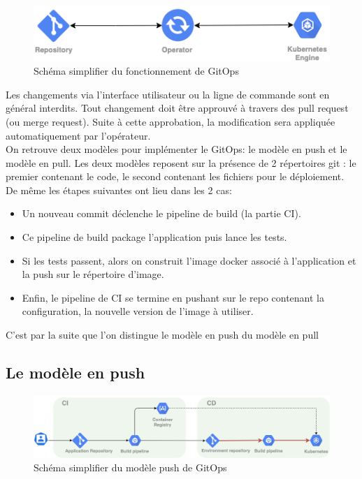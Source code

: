 \documentclass[11pt,fleqn]{book} %
\begin{document}
\begin{figure}[H]\centering
\renewcommand{\figurename}{Graphique}
\includegraphics[scale=0.8]{Pictures/CI-CD/gitops-Intro.png}
\captionsetup{margin=1.5cm,format=hang,justification=justified}
\caption[]{Schéma simplifier du fonctionnement de GitOps \newline}
\end{figure}

Les changements via l’interface utilisateur ou la ligne de commande sont en général interdits. Tout changement doit être approuvé à travers des pull request (ou merge request). Suite à cette approbation, la modification sera appliquée automatiquement par l’opérateur.\\

On retrouve deux modèles pour implémenter le GitOps: le modèle en push et le modèle en pull. Les deux modèles reposent sur la présence de 2 répertoires git : le premier contenant le code, le second contenant les fichiers pour le déploiement. De même les étapes suivantes ont lieu dans les 2 cas: 
\begin{itemize}
     \item Un nouveau commit déclenche le pipeline de build (la partie CI).
    \item Ce pipeline de build package l'application puis lance les tests.
    \item Si les tests passent, alors on construit l'image docker associé à l'application et la push sur le répertoire d'image.
    \item Enfin, le pipeline de CI se termine en pushant sur le repo contenant la configuration, la nouvelle version de l'image à utiliser.
\end{itemize}
C'est par la suite que l'on distingue le modèle en push du modèle en pull
\subsection{Le modèle en push}
\begin{figure}[H]
\renewcommand{\figurename}{Graphique}
\hspace{-2cm}
\includegraphics[scale=0.5]{Pictures/CI-CD/push.png}
\captionsetup{margin=1.5cm,format=hang,justification=justified}
\caption[]{Schéma simplifier du modèle push de GitOps \newline}
\end{figure}
\end{document}
